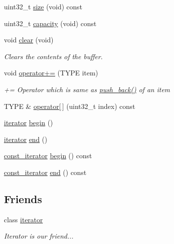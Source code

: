 \begin{DoxyCompactItemize}
\item 
uint32\+\_\+t \hyperlink{classCircularBuffer_a88253a12755af0082b7156dbaa197506}{size} (void) const 
\item 
uint32\+\_\+t \hyperlink{classCircularBuffer_a87e9e9d7eb50070d2b4a21b0462432e9}{capacity} (void) const 
\item 
void \hyperlink{classCircularBuffer_a51a1c7cb366dde83435e7213118a23c2}{clear} (void)
\begin{DoxyCompactList}\small\item\em Clears the contents of the buffer. \end{DoxyCompactList}\item 
void \hyperlink{classCircularBuffer_a0c62cd81bfc1f16b8c5c6f93dae3f00c}{operator+=} (T\+Y\+PE item)
\begin{DoxyCompactList}\small\item\em += Operator which is same as \hyperlink{classCircularBuffer_a874e11e8de40e5d6d478a39087960af8}{push\+\_\+back()} of an item \end{DoxyCompactList}\item 
T\+Y\+PE \& \hyperlink{classCircularBuffer_a9f547e56c0eca3166ae0c79d87b8c264}{operator\mbox{[}$\,$\mbox{]}} (uint32\+\_\+t index) const 
\end{DoxyCompactItemize}
{\bf }\par
\begin{DoxyCompactItemize}
\item 
\hyperlink{classCircularBuffer_1_1iterator}{iterator} \hyperlink{classCircularBuffer_a2f247c16874a1ed5366a972eb36b3781}{begin} ()
\item 
\hyperlink{classCircularBuffer_1_1iterator}{iterator} \hyperlink{classCircularBuffer_a6c64c8c145dbeb2b56b1fdf3ed359218}{end} ()
\item 
\hyperlink{classCircularBuffer_1_1const__iterator}{const\+\_\+iterator} \hyperlink{classCircularBuffer_a26d55467abd9e69f45581045a7d048c4}{begin} () const 
\item 
\hyperlink{classCircularBuffer_1_1const__iterator}{const\+\_\+iterator} \hyperlink{classCircularBuffer_a7b15719340d0459b80cce993bf3d122d}{end} () const 
\end{DoxyCompactItemize}

\subsection*{Friends}
\begin{DoxyCompactItemize}
\item 
class \hyperlink{classCircularBuffer_a67171474c4da6cc8efe0c7fafefd2b2d}{iterator}
\begin{DoxyCompactList}\small\item\em Iterator is our friend... \end{DoxyCompactList}\end{DoxyCompactItemize}


